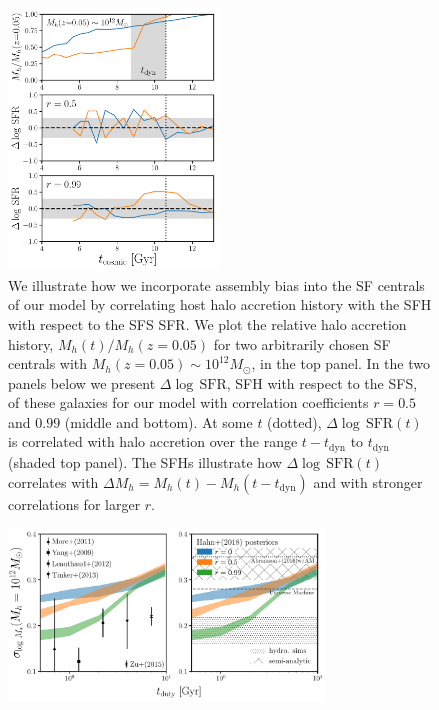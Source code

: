 \documentclass[12pt, letterpaper, preprint, tighten]{aastex}
\begin{document}
\begin{figure}
\begin{center}
\includegraphics[width=0.5\textwidth]{figs/Mhacc_dSFR.pdf}
\caption{We illustrate how we incorporate assembly bias into the SF 
    centrals of our model by correlating host halo accretion history with 
    the SFH with respect to the SFS SFR. We plot the relative halo accretion 
    history, $M_h(t)/M_h(z{=}0.05)$ for two arbitrarily chosen SF centrals 
    with $M_h(z{=}0.05)\sim10^{12}M_\odot$, in the top panel. In the two 
    panels below we present $\Delta\log\,\mathrm{SFR}$, SFH with 
    respect to the SFS, of these galaxies for our model with correlation 
    coefficients $r=0.5$ and $0.99$ (middle and bottom). At some $t$ (dotted), 
    $\Delta\log\,\mathrm{SFR}(t)$ is correlated with halo accretion over the 
    range $t - t_\mathrm{dyn}$ to $t_\mathrm{dyn}$ (shaded top panel). The 
    SFHs illustrate how $\Delta\log\,\mathrm{SFR}(t)$ correlates with 
    $\Delta M_h = M_h(t) - M_h(t-t_\mathrm{dyn})$ and with stronger correlations 
    for larger $r$.}
\label{fig:mhacc_dsfr}
\end{center}
\end{figure}

\begin{figure}
\begin{center}
\includegraphics[width=0.75\textwidth]{figs/SHMRscatter_tduty_abias2.pdf}
    \caption{}
\label{fig:sigMstar_duty_abias}
\end{center}
\end{figure}
\end{document}
